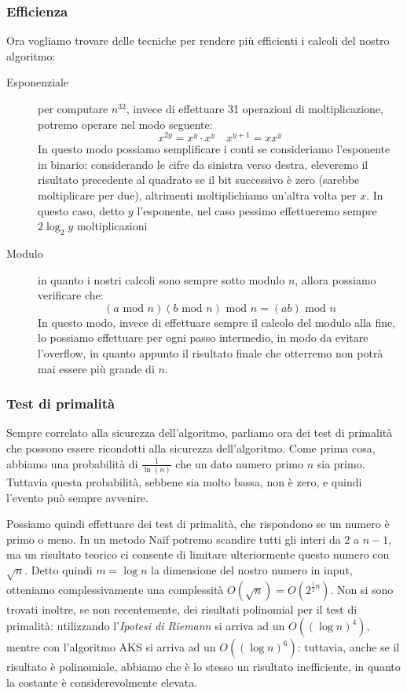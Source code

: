 \subsubsection{Efficienza}
Ora vogliamo trovare delle tecniche per rendere più efficienti i calcoli del nostro
algoritmo:
\begin{description}
\item[Esponenziale] per computare $n^{32}$, invece di effettuare 31 operazioni di 
		    moltiplicazione, potremo operare nel modo seguente:
		    \[x^{2y}=x^y\cdot x^y\quad x^{y+1}=xx^y\]
		    In questo modo possiamo semplificare i conti se consideriamo
		    l'esponente in binario: considerando le cifre da sinistra
		    verso destra, eleveremo il risultato precedente al quadrato
		    se il bit successivo è zero (sarebbe moltiplicare per due),
		    altrimenti moltiplichiamo un'altra volta per $x$. In questo
		    caso, detto $y$ l'esponente, nel caso pessimo effettueremo
		    sempre $2\log_2 y$ moltiplicazioni
\item[Modulo] in quanto i nostri calcoli sono sempre sotto modulo $n$, allora 
		    possiamo verificare che:
		    \[(a\text{ mod }n)(b\text{ mod }n)\text{ mod } n = (ab)\text{ mod }n\]
		    In questo modo, invece di effettuare sempre il calcolo del
		    modulo alla fine, lo possiamo effettuare per ogni passo
		    intermedio, in modo da evitare l'overflow, in quanto appunto
		    il risultato finale che otterremo non potrà mai essere più
		    grande di $n$.
\end{description}

\subsubsection{Test di primalità}
Sempre correlato alla sicurezza dell'algoritmo, parliamo ora dei test di 
primalità che possono essere ricondotti alla sicurezza dell'algoritmo. Come
prima cosa, abbiamo una probabilità di $\frac{1}{\ln(n)}$ che un dato numero
primo $n$ sia primo. Tuttavia questa probabilità, sebbene sia molto bassa, non
è zero, e quindi l'evento può sempre avvenire.

Possiamo quindi effettuare dei test di primalità, che rispondono se un numero
è primo o meno. In un metodo Naïf potremo scandire tutti gli interi da $2$ a
$n-1$, ma un risultato teorico ci consente di limitare ulteriormente questo
numero con $\sqrt n$. Detto quindi $m=\log n$ la dimensione del nostro numero
in input, otteniamo complessivamente una complessità $O(\sqrt n)=O(2^{\frac{1}{2}n})$.
Non si sono trovati inoltre, se non recentemente, dei risultati polinomial per
il test di primalità: utilizzando l'\textit{Ipotesi di Riemann} si arriva ad un
$O((\log n)^4)$, mentre con l'algoritmo AKS si arriva ad un $O((\log n)^6)$:
tuttavia, anche se il risultato è polinomiale, abbiamo che è lo stesso un
risultato inefficiente, in quanto la costante è considerevolmente elevata.

